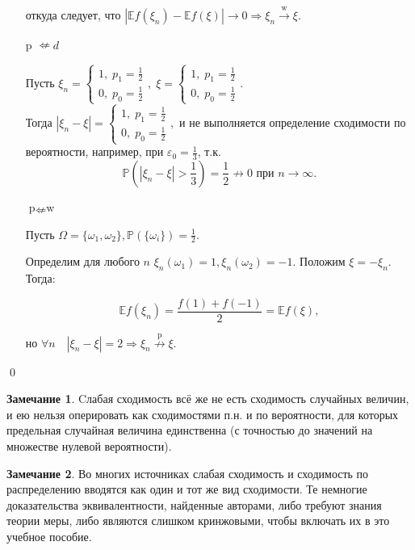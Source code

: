 \documentclass[oneside,final,14pt]{extreport}
\renewenvironment{proof}{{\bfseries Доказательство.}}{\qed}
\theoremstyle{plain}
\theoremstyle{definition}
\newtheorem*{rmrk}{Замечание}
\theoremstyle{named}
\begin{document}
\begin{proof}
\begin{itemize}
    откуда следует, что $|\mathbb{E}f(\xi_n) - \mathbb{E}f(\xi)| \rightarrow 0 \Rightarrow \xi_n \xrightarrow[]{\text{w}} \xi$.
    
    \item[p $\nLeftarrow d$]
    
    Пусть $\xi_n = \begin{cases}
    1, \; p_1 = \frac{1}{2} \\
    0, \; p_0 = \frac{1}{2}
    \end{cases}, \; 
    \xi = \begin{cases}
    1, \; p_1 = \frac{1}{2} \\
    0, \; p_0 = \frac{1}{2}
    \end{cases}.$ \\
    Тогда $|\xi_n - \xi| = \begin{cases}
    1, \; p_1 = \frac{1}{2} \\
    0, \; p_0 = \frac{1}{2}
    \end{cases},$ \; и не выполняется определение сходимости по вероятности, например, при $\varepsilon_0 = \frac{1}{3}$, т.к. 
    $$ \mathbb{P}\left({|\xi_n - \xi| > \frac{1}{3}}\right) = \frac{1}{2} {\nrightarrow} 0 \text{ при } n \to \infty.
    $$
    
   \item[$\text{p} \nLeftarrow \text{w}$]
    
    Пусть $\Omega = \{\omega_1, \omega_2 \}, \mathbb{P}(\{\omega_i \}) = \frac{1}{2}.$ 
    
    Определим для любого $n$ $\xi_n(\omega_1) = 1, \xi_n(\omega_2) = -1.$ Положим $\xi = -\xi_n.$ Тогда:
    
    $$ \mathbb{E}f(\xi_n) = \frac{f(1) + f(-1)}{2} = \mathbb{E}f(\xi),$$
    
    но $\forall n \quad |\xi_n - \xi| = 2 \Rightarrow \xi_n \overset{\text{p}}{\nrightarrow} \xi.$
    
\end{itemize}    
\end{proof}

\begin{rmrk}
    Cлабая сходимость всё же не есть сходимость случайных величин, и ею нельзя оперировать как сходимостями п.н. и по вероятности, для которых предельная случайная величина единственна (с точностью до значений на множестве нулевой вероятности).
\end{rmrk}

\begin{rmrk}
    Во многих источниках слабая сходимость и сходимость по распределению вводятся как один и тот же вид сходимости. Те немногие доказательства эквивалентности, найденные авторами, либо требуют знания теории меры, либо являются слишком кринжовыми, чтобы включать их в это учебное пособие.
\end{rmrk}
\end{document}
